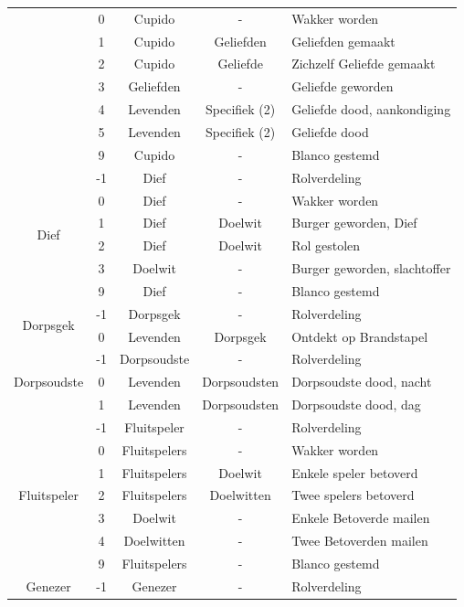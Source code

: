\documentclass[12pt]{article}
\begin{document}
\begin{center}
\begin{longtable}{c|c|c|c|l}
       & 0 & Cupido & - & Wakker worden \\
       & 1 & Cupido & Geliefden & Geliefden gemaakt \\
       & 2 & Cupido & Geliefde & Zichzelf Geliefde gemaakt \\
       & 3 & Geliefden & - & Geliefde geworden \\
       & 4 & Levenden & Specifiek (2) & Geliefde dood, aankondiging \\
       & 5 & Levenden & Specifiek (2) & Geliefde dood \\
       & 9 & Cupido & - & Blanco gestemd \\
      \hline
      \multirow{6}{*}{Dief} & -1 & Dief & - & Rolverdeling \\
       & 0 & Dief & - & Wakker worden \\
       & 1 & Dief & Doelwit & Burger geworden, Dief \\
       & 2 & Dief & Doelwit & Rol gestolen \\
       & 3 & Doelwit & - & Burger geworden, slachtoffer \\
       & 9 & Dief & - & Blanco gestemd \\
      \hline
      \multirow{2}{*}{Dorpsgek} & -1 & Dorpsgek & - & Rolverdeling \\
       & 0 & Levenden & Dorpsgek & Ontdekt op Brandstapel \\
      \hline
      \multirow{3}{*}{Dorpsoudste} & -1 & Dorpsoudste & - & Rolverdeling \\
       & 0 & Levenden & Dorpsoudsten & Dorpsoudste dood, nacht \\
       & 1 & Levenden & Dorpsoudsten & Dorpsoudste dood, dag \\
      \hline
      \multirow{7}{*}{Fluitspeler} & -1 & Fluitspeler & - & Rolverdeling \\
       & 0 & Fluitspelers & - & Wakker worden \\
       & 1 & Fluitspelers & Doelwit & Enkele speler betoverd \\
       & 2 & Fluitspelers & Doelwitten & Twee spelers betoverd \\
       & 3 & Doelwit & - & Enkele Betoverde mailen \\
       & 4 & Doelwitten & - & Twee Betoverden mailen \\
       & 9 & Fluitspelers & - & Blanco gestemd \\
      \hline
      \multirow{4}{*}{Genezer} & -1 & Genezer & - & Rolverdeling \\

\end{longtable}
\end{center}
\end{document}
